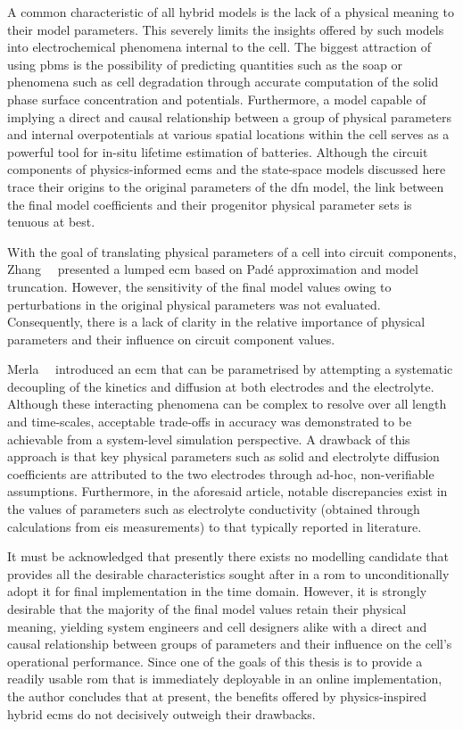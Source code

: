 A  common  characteristic  of all  hybrid  models  is  the  lack of  a  physical
meaning to  their model  parameters. This severely  limits the  insights offered
by  such  models  into  electrochemical  phenomena internal  to  the  cell.  The
biggest  attraction  of  using  \glspl{pbm} is  the  possibility  of  predicting
quantities such as the \gls{soap} or  phenomena such as cell degradation through
accurate computation  of the solid  phase surface concentration  and potentials.
Furthermore,  a model  capable  of  implying a  direct  and causal  relationship
between a  group of physical  parameters and internal overpotentials  at various
spatial locations within the cell serves as a powerful tool for in-situ lifetime
estimation  of batteries.  Although the  circuit components  of physics-informed
\glspl{ecm} and the state-space models discussed here trace their origins to the
original parameters  of the \gls{dfn}  model, the  link between the  final model
coefficients and their progenitor physical parameter sets is tenuous at best.


With  the  goal of  translating  physical  parameters  of  a cell  into  circuit
components, Zhang~\etal{}~\cite{Zhang2017} presented a lumped \gls{ecm} based on
Padé approximation and  model truncation. However, the sensitivity  of the final
model values owing to perturbations in  the original physical parameters was not
evaluated. Consequently, there  is a lack of clarity in  the relative importance
of physical parameters and their influence on circuit component values.


Merla~\etal{}~\cite{Merla2018} introduced an \gls{ecm}  that can be parametrised
by attempting  a systematic  decoupling of  the kinetics  and diffusion  at both
electrodes  and the  electrolyte. Although  these interacting  phenomena can  be
complex to  resolve over  all length and  time-scales, acceptable  trade-offs in
accuracy  was  demonstrated to  be  achievable  from a  system-level  simulation
perspective. A  drawback of this approach  is that key physical  parameters such
as  solid and  electrolyte  diffusion  coefficients are  attributed  to the  two
electrodes  through  ad-hoc,  non-verifiable assumptions.  Furthermore,  in  the
aforesaid article, notable discrepancies exist  in the values of parameters such
as  electrolyte  conductivity  (obtained  through  calculations  from  \gls{eis}
measurements) to that typically reported in literature.

It must be acknowledged that presently  there exists no modelling candidate that
provides  all the  desirable  characteristics  sought after  in  a \gls{rom}  to
unconditionally adopt it  for final implementation in the  time domain. However,
it is  strongly desirable  that the  majority of the  final model  values retain
their physical meaning, yielding system  engineers and cell designers alike with
a  direct  and  causal  relationship  between groups  of  parameters  and  their
influence on the cell's operational performance.  Since one of the goals of this
thesis is to  provide a readily usable \gls{rom} that  is immediately deployable
in an online implementation, the author  concludes that at present, the benefits
offered by physics-inspired hybrid \glspl{ecm}  do not decisively outweigh their
drawbacks.

